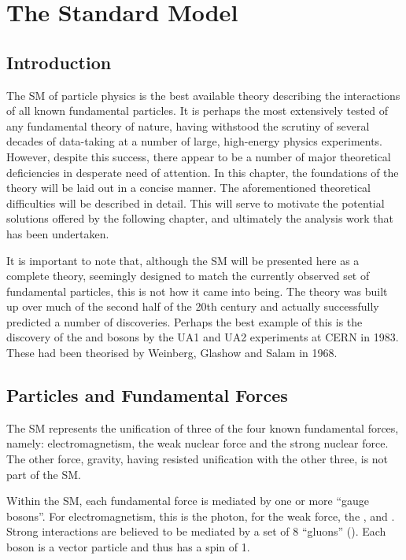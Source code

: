 \chapter{The Standard Model}
\label{sec:sm}
\section{Introduction}
The \acl{SM} of particle physics is the best available theory describing the
interactions of all known fundamental particles. It is perhaps the most
extensively tested of any fundamental theory of nature, having withstood the
scrutiny of several decades of data-taking at a number of large, high-energy
physics experiments. However, despite this success, there appear to be a number
of major theoretical deficiencies in desperate need of attention. In this
chapter, the foundations of the theory will be laid out in a concise manner. The
aforementioned theoretical difficulties will be described in detail. This will
serve to motivate the potential solutions offered by the following chapter, and
ultimately the analysis work that has been undertaken.

It is important to note that, although the \ac{SM} will be presented here as a
complete theory, seemingly designed to match the currently observed set of
fundamental particles, this is not how it came into being. The theory was built
up over much of the second half of the 20th century and actually successfully
predicted a number of discoveries. Perhaps the best example of this is the
discovery of the \PW and \PZ bosons by the \ac{UA1} and \ac{UA2} experiments at
\ac{CERN} in 1983. These had been theorised by Weinberg, Glashow and Salam in
1968.

\section{Particles and Fundamental Forces}
\label{sec:theory:particles}
The \ac{SM} represents the unification of three of the four known fundamental
forces, namely: electromagnetism, the weak nuclear force and the strong nuclear
force. The other force, gravity, having resisted unification with the other
three, is not part of the \ac{SM}.

Within the \ac{SM}, each fundamental force is mediated by one or more ``gauge
bosons''. For electromagnetism, this is the photon, for the weak force, the
\PWp, \PWm and \PZ. Strong interactions are believed to be mediated by a set of
8 ``gluons'' (\Pg). Each boson is a vector particle and thus has a spin of 1.

